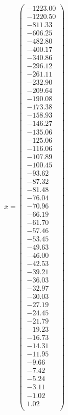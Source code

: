 \documentclass[a4paper,12pt]{article}
\begin{document}
$\bar { x } = \begin{pmatrix}
-1223.00 \\
-1220.50 \\
-811.33 \\
-606.25 \\
-482.80 \\
-400.17 \\
-340.86 \\
-296.12 \\
-261.11 \\
-232.90 \\
-209.64 \\
-190.08 \\
-173.38 \\
-158.93 \\
-146.27 \\
-135.06 \\
-125.06 \\
-116.06 \\
-107.89 \\
-100.45 \\
-93.62 \\
-87.32 \\
-81.48 \\
-76.04 \\
-70.96 \\
-66.19 \\
-61.70 \\
-57.46 \\
-53.45 \\
-49.63 \\
-46.00 \\
-42.53 \\
-39.21 \\
-36.03 \\
-32.97 \\
-30.03 \\
-27.19 \\
-24.45 \\
-21.79 \\
-19.23 \\
-16.73 \\
-14.31 \\
-11.95 \\
-9.66 \\
-7.42 \\
-5.24 \\
-3.11 \\
-1.02 \\
1.02 \\
\end{pmatrix}
$
\end{document}
